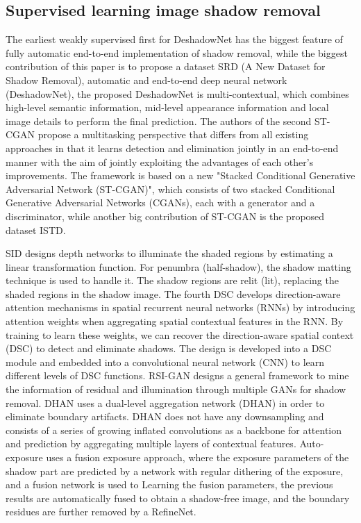 \documentclass[journal]{IEEEtran}
\begin{document}
\subsection{Supervised learning image shadow removal}
The earliest weakly supervised first for DeshadowNet \cite{1} has the biggest feature of fully automatic end-to-end implementation of shadow removal, while the biggest contribution of this paper is to propose a dataset SRD (A New Dataset for Shadow Removal), automatic and end-to-end deep neural network (DeshadowNet), the proposed DeshadowNet is multi-contextual, which combines high-level semantic information, mid-level appearance information and local image details to perform the final prediction. The authors of the second ST-CGAN \cite{2} propose a multitasking perspective that differs from all existing approaches in that it learns detection and elimination jointly in an end-to-end manner with the aim of jointly exploiting the advantages of each other's improvements. The framework is based on a new "Stacked Conditional Generative Adversarial Network (ST-CGAN)", which consists of two stacked Conditional Generative Adversarial Networks (CGANs), each with a generator and a discriminator, while another big contribution of ST-CGAN is the proposed dataset ISTD. \par
SID \cite{3} designs depth networks to illuminate the shaded regions by estimating a linear transformation function. For penumbra (half-shadow), the shadow matting technique is used to handle it. The shadow regions are relit (lit), replacing the shaded regions in the shadow image. The fourth DSC \cite{4}develops direction-aware attention mechanisms in spatial recurrent neural networks (RNNs) by introducing attention weights when aggregating spatial contextual features in the RNN. By training to learn these weights, we can recover the direction-aware spatial context (DSC) to detect and eliminate shadows. The design is developed into a DSC module and embedded into a convolutional neural network (CNN) to learn different levels of DSC functions. RSI-GAN \cite{5}designs a general framework to mine the information of residual and illumination through multiple GANs for shadow removal. DHAN \cite{6} uses a dual-level aggregation network (DHAN) in order to eliminate boundary artifacts. DHAN does not have any downsampling and consists of a series of growing inflated convolutions as a backbone for attention and prediction by aggregating multiple layers of contextual features. Auto-exposure \cite{7} uses a fusion exposure approach, where the exposure parameters of the shadow part are predicted by a network with regular dithering of the exposure, and a fusion network is used to Learning the fusion parameters, the previous results are automatically fused to obtain a shadow-free image, and the boundary residues are further removed by a RefineNet.
\end{document}
